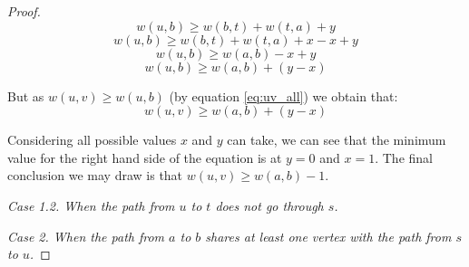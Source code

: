 \begin{proof}
$$ w(u, b) \ge w(b, t) + w(t, a) + y $$
$$ w(u, b) \ge w(b, t) + w(t, a) + x - x + y $$
$$ w(u, b) \ge w(a, b) - x + y $$
$$ w(u, b) \ge w(a, b) + (y - x) $$

But as $w(u, v) \ge w(u, b)$ (by equation \ref{eq:uv_all}) we obtain that:
$$ w(u, v) \ge w(a, b) + (y - x) $$

Considering all possible values $x$ and $y$ can take, we can see that the minimum value for the right hand side of the equation is at $y = 0$ and $x = 1$. The final conclusion we may draw is that $w(u, v) \ge w(a, b) -1$.




{\em Case 1.2. When the path from $u$ to $t$ does not go through $s$.}

{\em Case 2. When the path from $a$ to $b$ shares at least one vertex with the path from $s$ to $u$.}

\end{proof}

\cite{parikh1980adaptive}
